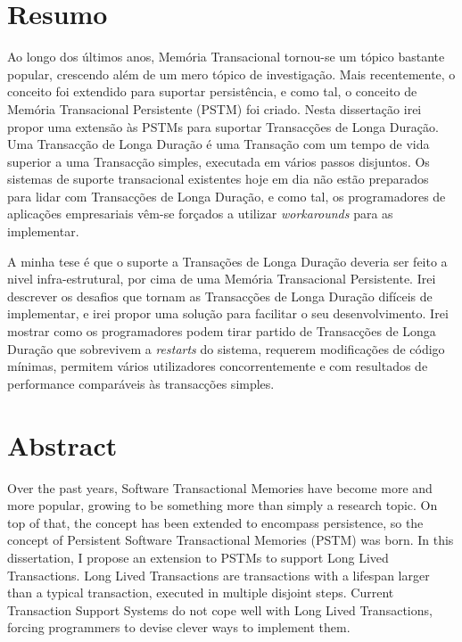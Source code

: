 \cleardoublepage



\chapter*{Resumo}
\thispagestyle{empty}

Ao longo dos últimos anos, Memória Transacional tornou-se um tópico
bastante popular, crescendo além de um mero tópico de investigação.
Mais recentemente, o conceito foi extendido para suportar
persistência, e como tal, o conceito de Memória Transacional
Persistente (PSTM) foi criado. Nesta dissertação irei propor uma
extensão às PSTMs para suportar Transacções de Longa Duração. Uma
Transacção de Longa Duração é uma Transação com um tempo de vida
superior a uma Transacção simples, executada em vários passos
disjuntos. Os sistemas de suporte transacional existentes hoje em dia
não estão preparados para lidar com Transacções de Longa Duração, e
como tal, os programadores de aplicações empresariais vêm-se forçados
a utilizar {\it workarounds} para as implementar.

A minha tese é que o suporte a Transações de Longa Duração deveria ser
feito a nivel infra-estrutural, por cima de uma Memória Transacional
Persistente. Irei descrever os desafios que tornam as Transacções de
Longa Duração difíceis de implementar, e irei propor uma solução para
facilitar o seu desenvolvimento. Irei mostrar como os programadores
podem tirar partido de Transacções de Longa Duração que sobrevivem a
{\it restarts} do sistema, requerem modificações de código mínimas,
permitem vários utilizadores concorrentemente e com resultados de
performance comparáveis às transacções simples.

\newpage
\thispagestyle{empty}

\chapter*{Abstract}
\thispagestyle{empty}

Over the past years, Software Transactional Memories have become more
and more popular, growing to be something more than simply a research
topic. On top of that, the concept has been extended to encompass
persistence, so the concept of Persistent Software Transactional
Memories (PSTM) was born. In this dissertation, I propose an extension
to PSTMs to support Long Lived Transactions. Long Lived Transactions
are transactions with a lifespan larger than a typical transaction,
executed in multiple disjoint steps. Current Transaction Support
Systems do not cope well with Long Lived Transactions, forcing
programmers to devise clever ways to implement them.

